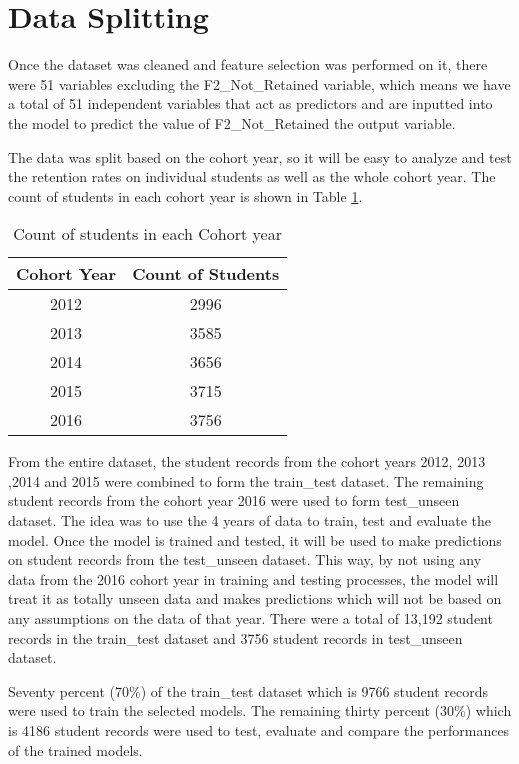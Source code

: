 \documentclass[11pt,openright]{report}
\begin{document}
\section {Data Splitting }

Once the dataset was cleaned and feature selection was performed on it, there were 51 variables excluding the F2\_Not\_Retained variable, which means we have a total of 51 independent variables that act as predictors and are inputted into the model to predict the value of F2\_Not\_Retained the output variable. 

The data was split based on the cohort year, so it will be easy to analyze and test the retention rates on individual students as well as the whole cohort year. The count of students in each cohort year is shown in Table \ref{table:acad_db}.

\begin{table}[!htbp]
	\renewcommand{\arraystretch}{1.3}
	\caption{Count of students in each Cohort year}
	\label{table:acad_db}
	\centering
	\begin{tabular}{|c|c|}
    \hline
    \bfseries Cohort Year & \bfseries Count of Students \\ 
    \hline
  	2012 &  2996 \\ \hline
	2013 & 3585 \\ \hline
	2014 & 3656 \\ \hline
	2015 & 3715 \\ \hline
	2016 & 3756 \\ \hline
\end{tabular} 
\end{table}

From the entire dataset, the student records from the cohort years 2012, 2013 ,2014 and 2015 were combined to form the train\_test dataset. The remaining student records from the cohort year 2016 were used to form test\_unseen dataset. The idea was to use the 4 years of data to train, test and evaluate the model. Once the model is trained and tested, it will be used to make predictions on student records from the test\_unseen dataset. This way, by not using any data from the 2016 cohort year in training and testing processes, the model will treat it as totally unseen data and makes predictions which will not be based on any assumptions on the data of that year. There were a total of 13,192 student records in the train\_test dataset and 3756 student records in test\_unseen dataset.

Seventy percent (70\%) of the train\_test dataset which is 9766 student records were used to train the selected models. The remaining thirty percent (30\%) which is 4186 student records were used to test, evaluate and compare the performances of the trained models. 
\end{document}
